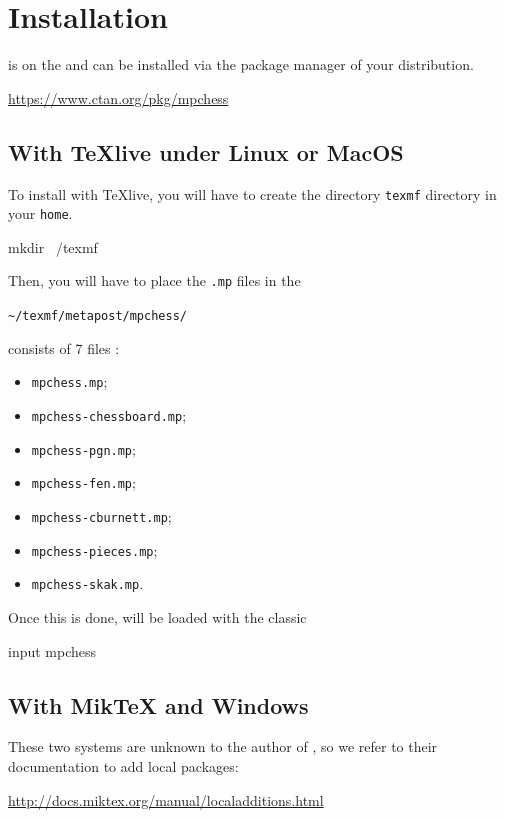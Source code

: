 \documentclass[english]{ltxdoc}
\begin{document}
\section{Installation}

\mpchess is on the \ctan{} and can be installed via the package manager of your
distribution.

\begin{center}
  \url{https://www.ctan.org/pkg/mpchess}
\end{center}


\subsection{With \TeX live under Linux or MacOS}

To install \mpchess with \TeX live, you will have to create the directory
\lstinline+texmf+ directory in your \lstinline+home+. 

\begin{commandshell}
mkdir ~/texmf
\end{commandshell}

Then, you will have to place the \lstinline+.mp+ files in the 
\begin{center}
  \lstinline+~/texmf/metapost/mpchess/+
\end{center}

\mpchess consists of 7 files  :
\begin{itemize}
  \item \verb+mpchess.mp+;
  \item \verb+mpchess-chessboard.mp+;
  \item \verb+mpchess-pgn.mp+;
  \item \verb+mpchess-fen.mp+;
  \item \verb+mpchess-cburnett.mp+;
  \item \verb+mpchess-pieces.mp+;
  \item \verb+mpchess-skak.mp+.
\end{itemize}

Once this is done, \mpchess will be loaded with the classic
\begin{mpcode}
input mpchess
\end{mpcode}

\subsection{With Mik\TeX{} and Windows}

These two systems are unknown to the author of \mpchess, so we refer to their documentation to add local packages:
\begin{center}
  \url{http://docs.miktex.org/manual/localadditions.html}
\end{center}
\end{document}

